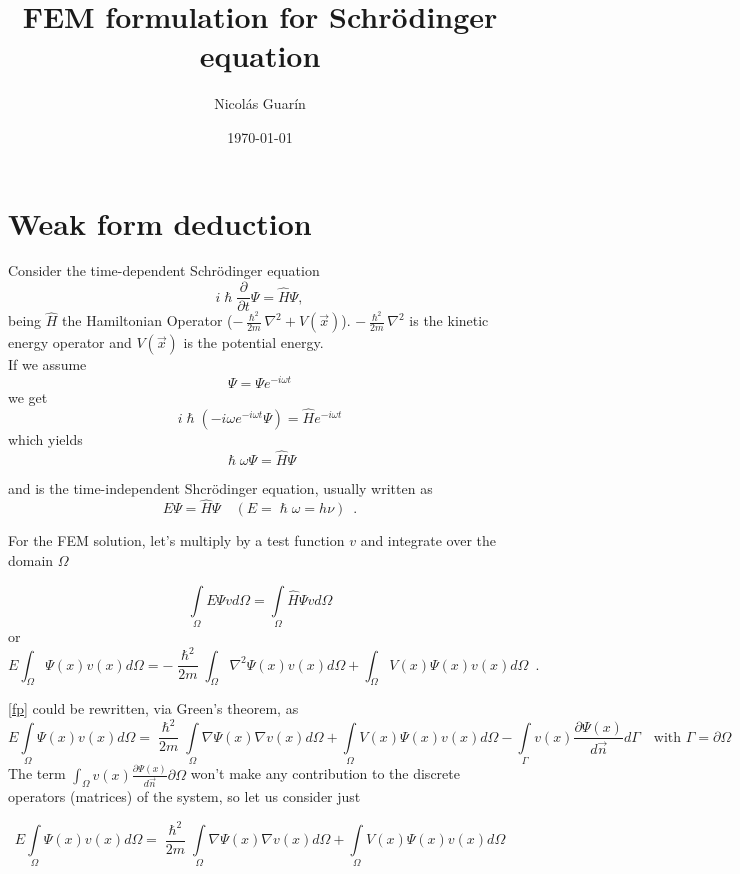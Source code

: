 \documentclass[12pt,letterpaper,final]{article}
\begin{document}
\title{\textbf{FEM formulation for Schr\"{o}dinger equation}}
\author{ Nicol\'as Guar\'in
}

\date{\today}
\maketitle

\section{Weak form deduction}
Consider the time-dependent Schr\"{o}dinger equation
\[i \hslash \frac{\partial}{\partial t}\Psi = \hat{H}\Psi ,\]
being $\hat{H}$ the Hamiltonian Operator ($-\frac{\hslash^2}{2m}\nabla^2 + V(\vec{x})$). $-\frac{\hslash^2}{2m}\nabla^2$ is the kinetic energy operator and $V(\vec{x})$ is the potential energy. \\

If we assume 
\[\Psi = \Psi e^{-i\omega t}\]
we get 
\[i \hslash (-i \omega e^{-i \omega t}\Psi)= \hat{H} e^{-i\omega t}\]
which yields 
\[\hslash \omega \Psi = \hat{H} \Psi\]

and is the time-independent Shcr\"{o}dinger equation, usually written as
\begin{equation}
E \Psi = \hat{H}\Psi \quad (E=\hslash \omega = h \nu) \enspace .
\end{equation}

For the FEM solution, let's multiply by a test function $v$ and integrate over the domain $\Omega$

\[\int\limits_{\Omega}E \Psi v d\Omega = \int\limits_{\Omega}\hat{H}\Psi v d\Omega\]
or
\begin{equation}
E \int_{\Omega}\Psi (x)v(x)d\Omega = -\frac{\hslash^2}{2m}\int_{\Omega}\nabla^2\Psi(x)v(x)d\Omega + \int_{\Omega}V(x)\Psi(x)v(x)d\Omega \enspace .
\label{fp}
\end{equation}

\eqref{fp} could be rewritten, via Green's theorem, as
\[E \int\limits_{\Omega} \Psi(x) v(x) d\Omega  =
\frac{\hslash^2}{2m} \int\limits_{\Omega}\nabla \Psi(x)\nabla v(x) d\Omega + \int\limits_{\Omega}V(x)\Psi(x)v(x)d\Omega - 
\int\limits_{\Gamma}v(x)\frac{\partial \Psi (x)}{d \vec{n}} d\Gamma \quad \mbox{with } \Gamma=\partial\Omega\]
The term $\int_{\Omega}v(x)\frac{\partial \Psi (x)}{d \vec{n}}\partial \Omega$ won't make any contribution to the discrete operators (matrices) of the system, so let us consider just

\begin{equation}
E \int\limits_{\Omega}\Psi (x)v(x)d\Omega  = \frac{\hslash^2}{2m} \int\limits_{\Omega}\nabla \Psi(x)\nabla v(x) d\Omega + \int\limits_{\Omega}V(x)\Psi(x)v(x)d\Omega
\label{fd}
\end{equation} 
 
\end{document}
